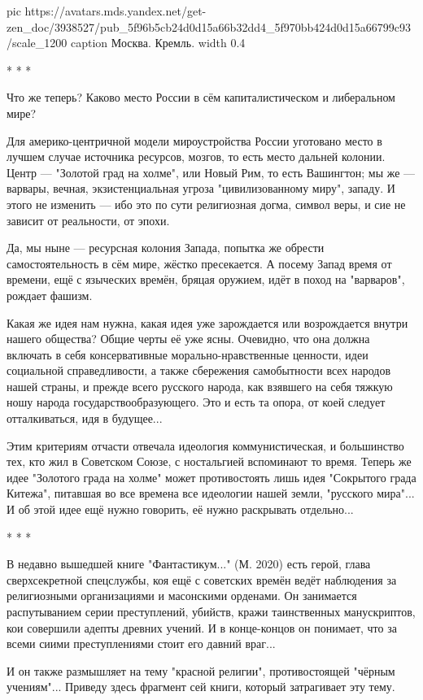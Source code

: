 \ifcmt
  pic https://avatars.mds.yandex.net/get-zen_doc/3938527/pub_5f96b5cb24d0d15a66b32dd4_5f970bb424d0d15a66799c93/scale_1200
  caption Москва. Кремль.
  width 0.4
\fi

* * *

Что же теперь? Каково место России в сём капиталистическом и либеральном мире?

Для америко-центричной модели мироустройства России уготовано место в лучшем
случае источника ресурсов, мозгов, то есть место дальней колонии. Центр —
"Золотой град на холме", или Новый Рим, то есть Вашингтон; мы же — варвары,
вечная, экзистенциальная угроза "цивилизованному миру", западу. И этого не
изменить — ибо это по сути религиозная догма, символ веры, и сие не зависит от
реальности, от эпохи.

Да, мы ныне — ресурсная колония Запада, попытка же обрести самостоятельность в
сём мире, жёстко пресекается. А посему Запад время от времени, ещё с языческих
времён, бряцая оружием, идёт в поход на "варваров", рождает фашизм.

Какая же идея нам нужна, какая идея уже зарождается или возрождается внутри
нашего общества? Общие черты её уже ясны. Очевидно, что она должна включать в
себя консервативные морально-нравственные ценности, идеи социальной
справедливости, а также сбережения самобытности всех народов нашей страны, и
прежде всего русского народа, как взявшего на себя тяжкую ношу народа
государствообразующего. Это и есть та опора, от коей следует отталкиваться, идя
в будущее...

Этим критериям отчасти отвечала идеология коммунистическая, и большинство тех,
кто жил в Советском Союзе, с ностальгией вспоминают то время. Теперь же идее
"Золотого града на холме" может противостоять лишь идея "Сокрытого града
Китежа", питавшая во все времена все идеологии нашей земли, "русского мира"...
И об этой идее ещё нужно говорить, её нужно раскрывать отдельно...

* * *

В недавно вышедшей книге "Фантастикум..." (М. 2020) есть герой, глава
сверхсекретной спецслужбы, коя ещё с советских времён ведёт наблюдения за
религиозными организациями и масонскими орденами. Он занимается распутыванием
серии преступлений, убийств, кражи таинственных манускриптов, кои совершили
адепты древних учений. И в конце-концов он понимает, что за всеми сиими
преступлениями стоит его давний враг...

И он также размышляет на тему "красной религии", противостоящей "чёрным
учениям"... Приведу здесь фрагмент сей книги, который затрагивает эту тему. 

